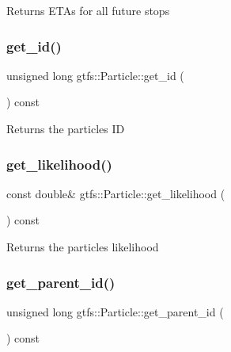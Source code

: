 \begin{DoxyReturn}{Returns}
E\+T\+As for all future stops 
\end{DoxyReturn}
\mbox{\label{classgtfs_1_1Particle_a3131eb93ac902a4cccf42061e1a7296b}} 
\subsubsection{\texorpdfstring{get\+\_\+id()}{get\_id()}}
{\footnotesize\ttfamily unsigned long gtfs\+::\+Particle\+::get\+\_\+id (\begin{DoxyParamCaption}{ }\end{DoxyParamCaption}) const}

\begin{DoxyReturn}{Returns}
the particle\textquotesingle{}s ID 
\end{DoxyReturn}
\mbox{\label{classgtfs_1_1Particle_a2e1a6de0b7d0fd6938ef3f7f9e5d4b99}} 
\subsubsection{\texorpdfstring{get\+\_\+likelihood()}{get\_likelihood()}}
{\footnotesize\ttfamily const double\& gtfs\+::\+Particle\+::get\+\_\+likelihood (\begin{DoxyParamCaption}{ }\end{DoxyParamCaption}) const\hspace{0.3cm}{\ttfamily [inline]}}

\begin{DoxyReturn}{Returns}
the particle\textquotesingle{}s likelihood 
\end{DoxyReturn}
\mbox{\label{classgtfs_1_1Particle_a9372dbbfe702b9931b9eb1ee217afcba}} 
\subsubsection{\texorpdfstring{get\+\_\+parent\+\_\+id()}{get\_parent\_id()}}
{\footnotesize\ttfamily unsigned long gtfs\+::\+Particle\+::get\+\_\+parent\+\_\+id (\begin{DoxyParamCaption}{ }\end{DoxyParamCaption}) const}

